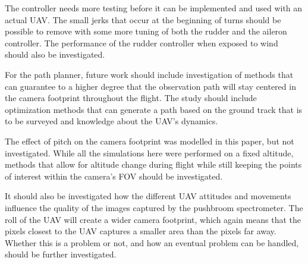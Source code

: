 The controller needs more testing before it can be implemented and used with an actual UAV. The small jerks that occur at the beginning of turns should be possible to remove with some more tuning of both the rudder and the aileron controller. The performance of the rudder controller when exposed to wind should also be investigated.

For the path planner, future work should include investigation of methods that can guarantee to a higher degree that the observation path will stay centered in the camera footprint throughout the flight. The study should include optimization methods that can generate a path based on the ground track that is to be surveyed and knowledge about the UAV's dynamics.

The effect of pitch on the camera footprint was modelled in this paper, but not investigated. While all the simulations here were performed on a fixed altitude, methods that allow for altitude change during flight while still keeping the points of interest within the camera's FOV should be investigated.

It should also be investigated how the different UAV attitudes and movements influence the quality of the images captured by the pushbroom spectrometer. The roll of the UAV will create a wider camera footprint, which again means that the pixels closest to the UAV captures a smaller area than the pixels far away. Whether this is a problem or not, and how an eventual problem can be handled, should be further investigated.